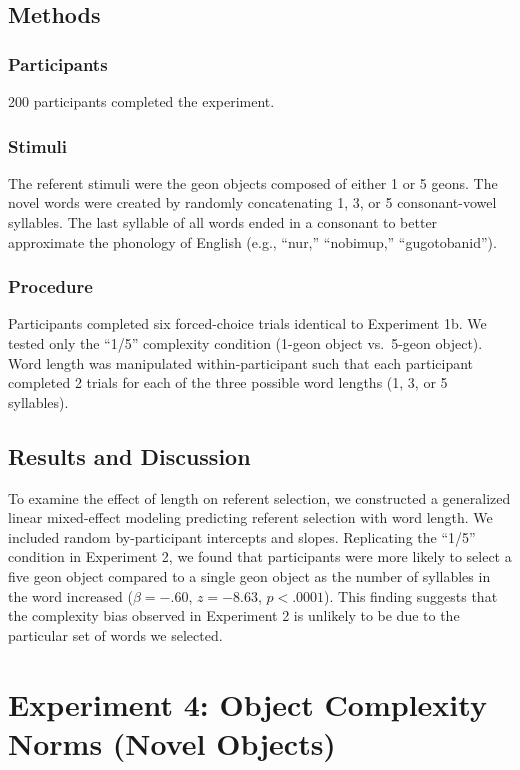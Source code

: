 \documentclass[man]{apa2}
\begin{document}
\subsection{Methods}
\subsubsection{Participants} 200 participants completed the experiment.
\subsubsection{Stimuli} The referent stimuli were the geon objects composed of either 1 or 5 geons. The novel words were created by randomly concatenating 1, 3, or 5 consonant-vowel syllables. The last syllable of all words ended in a consonant to better approximate the phonology of English (e.g., ``nur,'' ``nobimup,'' ``gugotobanid'').

\subsubsection{Procedure}
Participants completed six forced-choice trials identical to Experiment 1b. We tested only the ``1/5'' complexity condition (1-geon object vs.\ 5-geon object). Word length was manipulated within-participant such that each participant completed 2 trials for each of the three possible word lengths (1, 3, or 5 syllables).

\subsection{Results and Discussion}
To examine the effect of length on referent selection, we constructed a generalized linear mixed-effect modeling predicting referent selection with word length. We included random by-participant intercepts and slopes. Replicating the ``1/5'' condition in Experiment 2, we found that participants were more likely to select a five geon object compared to a single geon object as the number of syllables in the word increased ($\beta=-.60$, $z =-8.63$, $p <.0001$). This finding suggests that the complexity bias observed in Experiment 2 is unlikely to be due to the particular set of words we selected.

\section{Experiment 4: Object Complexity Norms (Novel Objects)}
\end{document}

